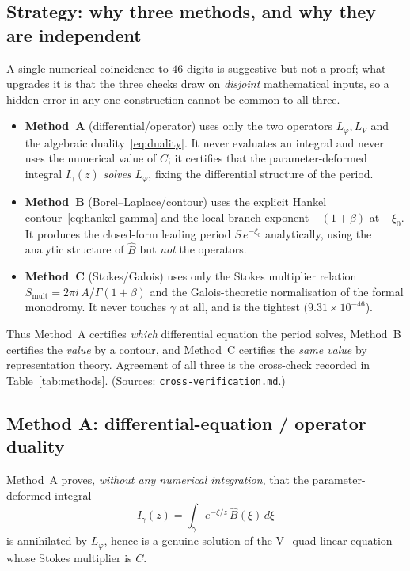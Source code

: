 \documentclass[11pt,reqno]{amsart}
\theoremstyle{plain}
\theoremstyle{definition}
\newcommand{\Bhat}{\widehat{B}}
\newcommand{\Lphi}{L_{\varphi}}
\newcommand{\LV}{L_{V}}
\newcommand{\xizero}{\xi_0}
\providecommand{\C}{}\renewcommand{\C}{C}
\begin{document}
\subsection{Strategy: why three methods, and why they are independent}\label{sub:strategy}
A single numerical coincidence to $46$ digits is suggestive but not a proof; what upgrades it is
that the three checks draw on \emph{disjoint} mathematical inputs, so a hidden error in any one
construction cannot be common to all three.
\begin{itemize}[leftmargin=1.6em]
\item \textbf{Method~A} (differential/operator) uses only the two operators $\Lphi,\LV$ and the
algebraic duality~\eqref{eq:duality}. It never evaluates an integral and never uses the numerical
value of $\C$; it certifies that the parameter-deformed integral $I_\gamma(z)$ \emph{solves
$\Lphi$}, fixing the differential structure of the period.
\item \textbf{Method~B} (Borel--Laplace/contour) uses the explicit Hankel
contour~\eqref{eq:hankel-gamma} and the local branch exponent $-(1+\beta)$ at $-\xizero$. It
produces the closed-form leading period $S\,e^{-\xizero}$ analytically, using the analytic
structure of $\Bhat$ but \emph{not} the operators.
\item \textbf{Method~C} (Stokes/Galois) uses only the Stokes multiplier relation
$S_{\mathrm{mult}}=2\pi i\,A/\Gamma(1+\beta)$ and the Galois-theoretic normalisation of the
formal monodromy. It never touches $\gamma$ at all, and is the tightest ($9.31\times10^{-46}$).
\end{itemize}
Thus Method~A certifies \emph{which} differential equation the period solves, Method~B certifies
the \emph{value} by a contour, and Method~C certifies the \emph{same value} by representation
theory. Agreement of all three is the cross-check recorded in Table~\ref{tab:methods}. (Sources:
\texttt{cross-verification.md}.)

\subsection{Method A: differential-equation / operator duality}\label{sub:methodA}
Method~A proves, \emph{without any numerical integration}, that the parameter-deformed integral
\begin{equation}\label{eq:Igamma}
  I_\gamma(z)=\int_\gamma e^{-\xi/z}\,\Bhat(\xi)\,d\xi
\end{equation}
is annihilated by $\Lphi$, hence is a genuine solution of the V\_quad linear equation whose
Stokes multiplier is $\C$.
\end{document}
